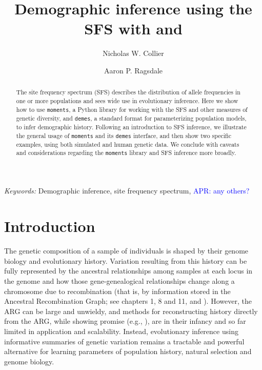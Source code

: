 \documentclass[]{article}
\title{Demographic inference using the SFS with \moments and \demes}
\author[1]{Nicholas W. Collier}
\author[1,*]{Aaron P. Ragsdale}
\affil[1]{Department of Integrative Biology, University of Wisconsin--Madison}
\affil[*]{apragsdale@wisc.edu}
\affil[ ]{ORCID IDs: 0009-0005-0385-9798 (NWC), 0000-0003-0715-3432 (APR)}
\newcommand{\aprcomment}[1]{{\textcolor{blue}{APR: #1}}}
\newcommand{\moments}{\texttt{moments}\xspace}
\newcommand{\demes}{\texttt{demes}\xspace}
\begin{document}
\linenumbers
\doublespacing

\maketitle

\begin{abstract}

    The site frequency spectrum (SFS) describes the distribution of allele
    frequencies in one or more populations and sees wide use in evolutionary
    inference. Here we show how to use \moments, a Python library for working
    with the SFS and other measures of genetic diversity, and \demes, a
    standard format for parameterizing population models, to infer demographic
    history. Following an introduction to SFS inference, we illustrate the
    general usage of \moments and its \demes interface, and then show two
    specific examples, using both simulated and human genetic data. We conclude
    with caveats and considerations regarding the \moments library and SFS
    inference more broadly.

\end{abstract}

\emph{Keywords:} Demographic inference, site frequency spectrum, \aprcomment{any others?}


\section*{Introduction}

The genetic composition of a sample of individuals is shaped by their genome
biology and evolutionary history. Variation resulting from this history can be
fully represented by the ancestral relationships among samples at each locus in
the genome and how those gene-genealogical relationships change along a
chromosome due to recombination (that is, by information stored in the
Ancestral Recombination Graph; see chapters 1, 8 and 11, and
\cite{nielsen2025inference}). However, the ARG can be large and unwieldy, and
methods for reconstructing history directly from the ARG, while showing promise
(e.g., \cite{yc2022evaluation, fan2023likelihood, brandt2024promise}), are in
their infancy and so far limited in application and scalability. Instead,
evolutionary inference using informative summaries of genetic variation remains
a tractable and powerful alternative for learning parameters of population
history, natural selection and genome biology.
\end{document}

